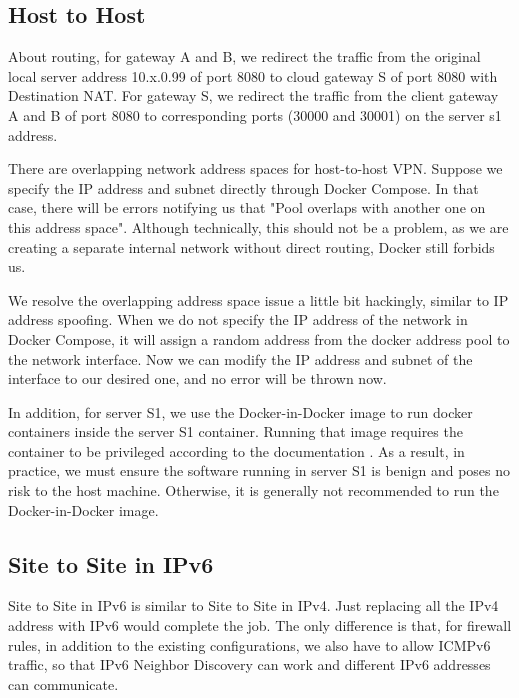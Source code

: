 \documentclass[article]{aaltoseries}
\begin{document}
\subsection{Host to Host}

About routing, for gateway A and B, we redirect the traffic from the original local server address 10.x.0.99 of port 8080 to cloud gateway S of port 8080 with Destination NAT. For gateway S, we redirect the traffic from the client gateway A and B of port 8080 to corresponding ports (30000 and 30001) on the server s1 address.

There are overlapping network address spaces for host-to-host VPN. Suppose we specify the IP address and subnet directly through Docker Compose. In that case, there will be errors notifying us that "Pool overlaps with another one on this address space". Although technically, this should not be a problem, as we are creating a separate internal network without direct routing, Docker still forbids us.

We resolve the overlapping address space issue a little bit hackingly, similar to IP address spoofing. When we do not specify the IP address of the network in Docker Compose, it will assign a random address from the docker address pool to the network interface. Now we can modify the IP address and subnet of the interface to our desired one, and no error will be thrown now.

In addition, for server S1, we use the Docker-in-Docker image to run docker containers inside the server S1 container. Running that image requires the container to be privileged according to the documentation \cite{docker}. As a result, in practice, we must ensure the software running in server S1 is benign and poses no risk to the host machine. Otherwise, it is generally not recommended to run the Docker-in-Docker image.

\subsection{Site to Site in IPv6}

Site to Site in IPv6 is similar to Site to Site in IPv4. Just replacing all the IPv4 address with IPv6 would complete the job. The only difference is that, for firewall rules, in addition to the existing configurations, we also have to allow ICMPv6 traffic, so that IPv6 Neighbor Discovery can work and different IPv6 addresses can communicate.

\end{document}
